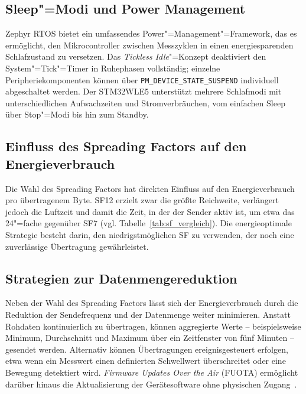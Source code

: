 \subsection{Sleep"=Modi und Power Management}
\label{subsec:sleep}

Zephyr RTOS bietet ein umfassendes Power"=Management"=Framework, das es ermöglicht,
den Mikrocontroller zwischen Messzyklen in einen energiesparenden Schlafzustand zu
versetzen. Das \textit{Tickless Idle}"=Konzept deaktiviert den System"=Tick"=Timer
in Ruhephasen vollständig; einzelne Peripheriekomponenten können über
\texttt{PM\_DEVICE\_STATE\_SUSPEND} individuell abgeschaltet werden. Der STM32WLE5
unterstützt mehrere Schlafmodi mit unterschiedlichen Aufwachzeiten und
Stromverbräuchen, vom einfachen Sleep über Stop"=Modi bis hin zum Standby.

\subsection{Einfluss des Spreading Factors auf den Energieverbrauch}
\label{subsec:sf-energie}

Die Wahl des Spreading Factors hat direkten Einfluss auf den Energieverbrauch pro
übertragenem Byte. SF12 erzielt zwar die größte Reichweite, verlängert jedoch die
Luftzeit und damit die Zeit, in der der Sender aktiv ist, um etwa das 24"=fache
gegenüber SF7 (vgl. Tabelle~\ref{tab:sf_vergleich}). Die energieoptimale Strategie
besteht darin, den niedrigstmöglichen SF zu verwenden, der noch eine zuverlässige
Übertragung gewährleistet.

\subsection{Strategien zur Datenmengereduktion}
\label{subsec:datenreduktion}

Neben der Wahl des Spreading Factors lässt sich der Energieverbrauch durch die
Reduktion der Sendefrequenz und der Datenmenge weiter minimieren. Anstatt Rohdaten
kontinuierlich zu übertragen, können aggregierte Werte -- beispielsweise Minimum,
Durchschnitt und Maximum über ein Zeitfenster von fünf Minuten -- gesendet werden.
Alternativ können Übertragungen ereignisgesteuert erfolgen, etwa wenn ein Messwert
einen definierten Schwellwert überschreitet oder eine Bewegung detektiert wird.
\textit{Firmware Updates Over the Air} (FUOTA) ermöglicht darüber hinaus die
Aktualisierung der Gerätesoftware ohne physischen Zugang~\cite{semtech_lora_basics}.


